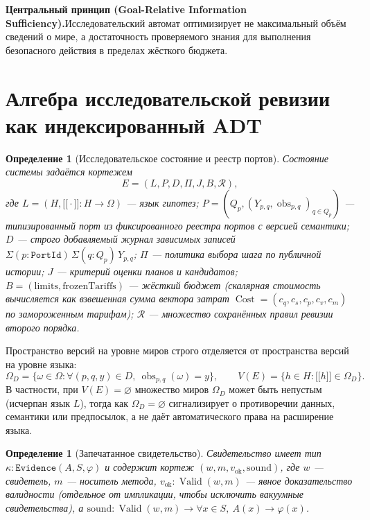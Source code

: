 \documentclass[11pt,a4paper]{article}
\theoremstyle{preprintthm}
\theoremstyle{preprintdef}
\newtheorem{definition}[theorem]{Определение}
\newcommand{\takeaway}[2]{%
  \vspace{4pt}\noindent\colorbox{bgbox}{%
    \parbox{\dimexpr\linewidth-2\fboxsep\relax}{%
      \vspace{3pt}\textbf{\color{primary}#1.}\hspace{0.4em}#2\vspace{3pt}%
    }%
  }\vspace{4pt}%
}
\newcommand{\Cost}{\operatorname{Cost}}
\newcommand{\obs}{\operatorname{obs}}
\newcommand{\Valid}{\operatorname{Valid}}
\providecommand{\llbracket}{\mathopen{[\![}}
\providecommand{\rrbracket}{\mathclose{]\!]}}
\begin{document}
\takeaway{Центральный принцип (Goal-Relative Information Sufficiency)}{Исследовательский автомат оптимизирует не максимальный объём сведений о мире, а достаточность проверяемого знания для выполнения безопасного действия в пределах жёсткого бюджета.}

\section{Алгебра исследовательской ревизии как индексированный ADT}

\begin{definition}[Исследовательское состояние и реестр портов]
Состояние системы задаётся кортежем
\begin{equation}
  E = (L, P, D, \Pi, J, B, \mathcal{R}),
\end{equation}
где $L = (H, \llbracket\cdot\rrbracket : H\to\Omega)$ --- язык гипотез; $P = (Q_p, (Y_{p,q}, \obs_{p,q})_{q\in Q_p})$ --- типизированный порт из фиксированного реестра портов с версией семантики; $D$ --- строго добавляемый журнал зависимых записей $\Sigma(p:\texttt{PortId})\,\Sigma(q:Q_p)\,Y_{p,q}$; $\Pi$ --- политика выбора шага по публичной истории; $J$ --- критерий оценки планов и кандидатов; $B = (\mathrm{limits}, \mathrm{frozenTariffs})$ --- жёсткий бюджет (скалярная стоимость вычисляется как взвешенная сумма вектора затрат $\Cost=(c_q,c_s,c_p,c_v,c_m)$ по замороженным тарифам); $\mathcal{R}$ --- множество сохранённых правил ревизии второго порядка.
\end{definition}

Пространство версий на уровне миров строго отделяется от пространства версий на уровне языка:
\begin{equation}
  \Omega_D = \{\omega\in\Omega : \forall (p,q,y)\in D,\ \obs_{p,q}(\omega)=y\},
  \qquad
  V(E) = \{h\in H : \llbracket h\rrbracket \in \Omega_D\}.
\end{equation}
В частности, при $V(E)=\varnothing$ множество миров $\Omega_D$ может быть непустым (исчерпан язык $L$), тогда как $\Omega_D=\varnothing$ сигнализирует о противоречии данных, семантики или предпосылок, а не даёт автоматического права на расширение языка.

\begin{definition}[Запечатанное свидетельство]
Свидетельство имеет тип $\kappa : \texttt{Evidence}(A, S, \varphi)$ и содержит кортеж $(w, m, v_{\mathrm{ok}}, \mathrm{sound})$, где $w$ --- свидетель, $m$ --- носитель метода, $v_{\mathrm{ok}} : \Valid(w,m)$ --- явное доказательство валидности (отдельное от импликации, чтобы исключить вакуумные свидетельства), а $\mathrm{sound} : \Valid(w,m)\to \forall x\in S,\ A(x)\to\varphi(x)$.
\end{definition}
\end{document}
